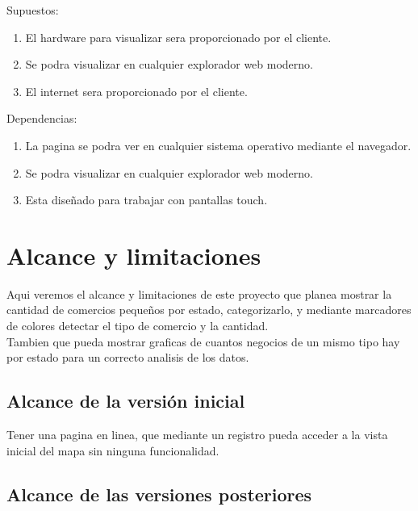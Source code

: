 \documentclass[12pt]{article}
\begin{document}
Supuestos:
\begin{enumerate}
        \item El hardware para visualizar sera proporcionado por el cliente.
        \item Se podra visualizar en cualquier explorador web moderno.
        \item El internet sera proporcionado por el cliente.
\end{enumerate}

Dependencias:
\begin{enumerate}
        \item La pagina se podra ver en cualquier sistema operativo mediante el navegador.
        \item Se podra visualizar en cualquier explorador web moderno.
        \item Esta diseñado para trabajar con pantallas touch.
\end{enumerate}

\section{Alcance y limitaciones}

Aqui veremos el alcance y limitaciones de este proyecto que planea mostrar la cantidad de comercios pequeños por estado, categorizarlo, y mediante marcadores de colores detectar el tipo de comercio y la cantidad.\\

Tambien que pueda mostrar graficas de cuantos negocios de un mismo tipo hay por estado para un correcto analisis de los datos.
 
\subsection{Alcance de la versión inicial}\label{ant}

Tener una pagina en linea, que mediante un registro pueda acceder a la vista inicial del mapa sin ninguna funcionalidad.

\subsection{Alcance de las versiones posteriores}\label{on}
\end{document}
